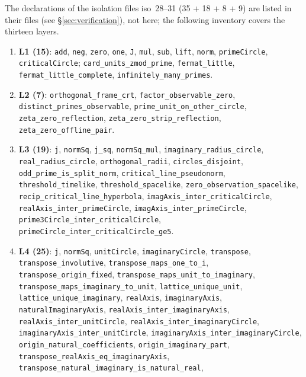 \documentclass{article}
\begin{document}
The declarations of the isolation files iso~28--31 (35 + 18 + 8 + 9) are
listed in their files (see \S\ref{sec:verification}), not here; the
following inventory covers the thirteen layers.

{\small\begin{sloppypar}
\begin{enumerate}
\item \textbf{L1 (15)}: \texttt{add}, \texttt{neg}, \texttt{zero},
\texttt{one}, \texttt{J}, \texttt{mul}, \texttt{sub}, \texttt{lift},
\texttt{norm}, \texttt{primeCircle}, \texttt{criticalCircle};
\texttt{card\_units\_zmod\_prime}, \texttt{fermat\_little},
\texttt{fermat\_little\_complete}, \texttt{infinitely\_many\_primes}.
\item \textbf{L2 (7)}: \texttt{orthogonal\_frame\_crt},
\texttt{factor\_observable\_zero}, \texttt{distinct\_primes\_observable},
\texttt{prime\_unit\_on\_other\_circle}, \texttt{zeta\_zero\_reflection},
\texttt{zeta\_zero\_strip\_reflection}, \texttt{zeta\_zero\_offline\_pair}.
\item \textbf{L3 (19)}: \texttt{j}, \texttt{normSq}, \texttt{j\_sq},
\texttt{normSq\_mul}, \texttt{imaginary\_radius\_circle},
\texttt{real\_radius\_circle}, \texttt{orthogonal\_radii},
\texttt{circles\_disjoint}, \texttt{odd\_prime\_is\_split\_norm},
\texttt{critical\_line\_pseudonorm}, \texttt{threshold\_timelike},
\texttt{threshold\_spacelike}, \texttt{zero\_observation\_spacelike},
\texttt{recip\_critical\_line\_hyperbola},
\texttt{imagAxis\_inter\_criticalCircle}, \texttt{realAxis\_inter\_primeCircle},
\texttt{imagAxis\_inter\_primeCircle},
\texttt{prime3Circle\_inter\_criticalCircle},
\texttt{primeCircle\_inter\_criticalCircle\_ge5}.
\item \textbf{L4 (25)}: \texttt{j}, \texttt{normSq}, \texttt{unitCircle},
\texttt{imaginaryCircle}, \texttt{transpose},
\texttt{transpose\_involutive}, \texttt{transpose\_maps\_one\_to\_i},
\texttt{transpose\_origin\_fixed}, \texttt{transpose\_maps\_unit\_to\_imaginary},
\texttt{transpose\_maps\_imaginary\_to\_unit},
\texttt{lattice\_unique\_unit}, \texttt{lattice\_unique\_imaginary},
\texttt{realAxis}, \texttt{imaginaryAxis}, \texttt{naturalImaginaryAxis},
\texttt{realAxis\_inter\_imaginaryAxis},
\texttt{realAxis\_inter\_unitCircle}, \texttt{realAxis\_inter\_imaginaryCircle},
\texttt{imaginaryAxis\_inter\_unitCircle},
\texttt{imaginaryAxis\_inter\_imaginaryCircle},
\texttt{origin\_natural\_coefficients}, \texttt{origin\_imaginary\_part},
\texttt{transpose\_realAxis\_eq\_imaginaryAxis},
\texttt{transpose\_natural\_imaginary\_is\_natural\_real},

\end{enumerate}
\end{sloppypar}}
\end{document}
